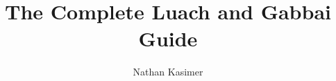 \documentclass[11pt, openany]{book}
\begin{document}
	
	\title{The Complete Luach and Gabbai Guide}
	
	\author{Nathan Kasimer}
	
	\maketitle
	
	\tableofcontents
			
	
	
	
	
	
	
	
\end{document}
